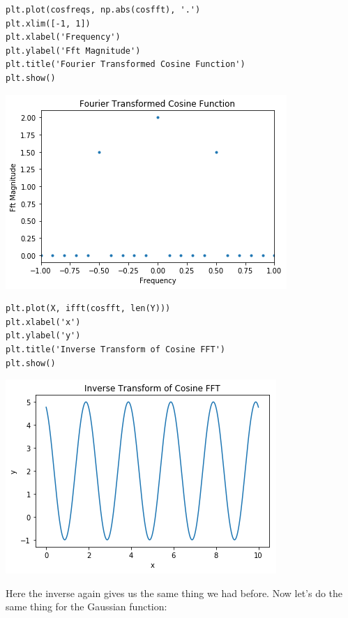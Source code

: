 \documentclass[11pt]{article}
\begin{document}
\begin{verbatim}
plt.plot(cosfreqs, np.abs(cosfft), '.')
plt.xlim([-1, 1])
plt.xlabel('Frequency')
plt.ylabel('Fft Magnitude')
plt.title('Fourier Transformed Cosine Function')
plt.show()
\end{verbatim}

\includegraphics[width=.9\linewidth]{./obipy-resources/333d8q.png}

\begin{verbatim}
plt.plot(X, ifft(cosfft, len(Y)))
plt.xlabel('x')
plt.ylabel('y')
plt.title('Inverse Transform of Cosine FFT')
plt.show()
\end{verbatim}

\includegraphics[width=.9\linewidth]{./obipy-resources/333qGx.png}

Here the inverse again gives us the same thing we had before. Now let's do the
same thing for the Gaussian function:
\end{document}
